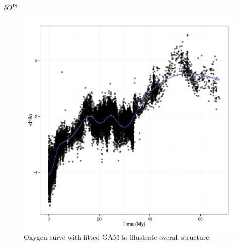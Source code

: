 \documentclass[final]{beamer}\usepackage[]{graphicx}\usepackage[]{color}
\newlength{\onecolwid}
\newlength{\twocolwid}
\begin{document}
\begin{frame}[t]
\begin{columns}[t]
    \begin{column}{\twocolwid}
      \begin{columns}[t,totalwidth = \twocolwid]
        \begin{column}{\onecolwid}
          \begin{block}{\(\delta O^{18}\)}
            \begin{figure}[ht]
              \centering
              \includegraphics[height = 0.2\textheight]{figure/zachos}
              \caption{Oxygen curve \citep{Zachos2008} with fitted GAM to illustrate overall structure.}
              \label{fig:zac}
            \end{figure}
          \end{block}
        \end{column}


\end{columns}
\end{column}
\end{columns}
\end{frame}
\end{document}
